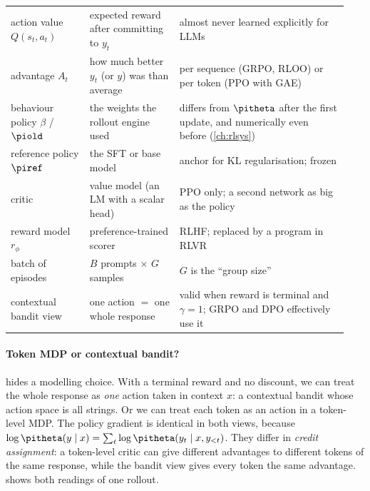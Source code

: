 {\begin{longtable}{@{}p{0.22\linewidth}p{0.25\linewidth}p{0.47\linewidth}@{}}
action value $Q(s_t,a_t)$ & expected reward after committing to $y_t$ & almost never learned explicitly for LLMs\\
advantage $A_t$ & how much better $y_t$ (or $y$) was than average & per sequence (GRPO, RLOO) or per token (PPO with GAE)\\
behaviour policy $\beta$ / $\piold$ & the weights the rollout engine used & differs from $\pitheta$ after the first update, and numerically even before (\cref{ch:rlsys})\\
reference policy $\piref$ & the SFT or base model & anchor for KL regularisation; frozen\\
critic & value model (an LM with a scalar head) & PPO only; a second network as big as the policy\\
reward model $r_\phi$ & preference-trained scorer & RLHF; replaced by a program in RLVR\\
batch of episodes & $B$ prompts $\times$ $G$ samples & $G$ is the ``group size''\\
contextual bandit view & one action $=$ one whole response & valid when reward is terminal and $\gamma=1$; GRPO and DPO effectively use it\\
\bottomrule
\end{longtable}}

\paragraph{Token MDP or contextual bandit?}  hides a modelling choice.
With a terminal reward and no discount, we can treat the whole response as \emph{one} action
taken in context $x$: a contextual bandit whose action space is all strings. Or we can treat
each token as an action in a token-level MDP. The policy gradient is identical in both views,
because $\log\pitheta(y\mid x)=\sum_t\log\pitheta(y_t\mid x,y_{<t})$. They differ in
\emph{credit assignment}: a token-level critic can give different advantages to different
tokens of the same response, while the bandit view gives every token the same advantage.
 shows both readings of one rollout.

